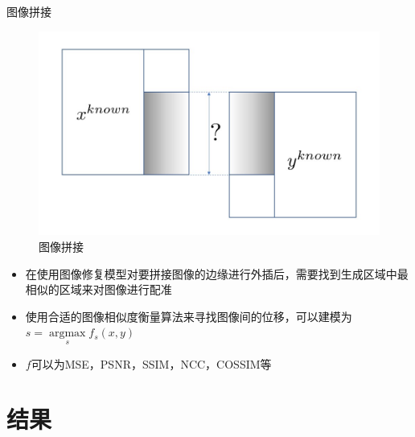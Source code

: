 \documentclass[10pt]{beamer}
\begin{document}
\begin{frame}[fragile]{图像拼接}
  \begin{figure}[thbp!]
    \centering
    \includegraphics[width=0.6\linewidth]{imgs/stitch.jpg}
    \caption{图像拼接}
    \label{fig:stitch}
    \end{figure}

  \begin{itemize}
    \item 在使用图像修复模型对要拼接图像的边缘进行外插后，需要找到生成区域中最相似的区域来对图像进行配准
    \item 使用合适的图像相似度衡量算法来寻找图像间的位移，可以建模为$s = \mathop{\arg\max}\limits_{s} f_s(x, y)$
    \item $f$可以为MSE，PSNR，SSIM，NCC，COSSIM等
  \end{itemize}
\end{frame}

\section{结果}
\end{document}
